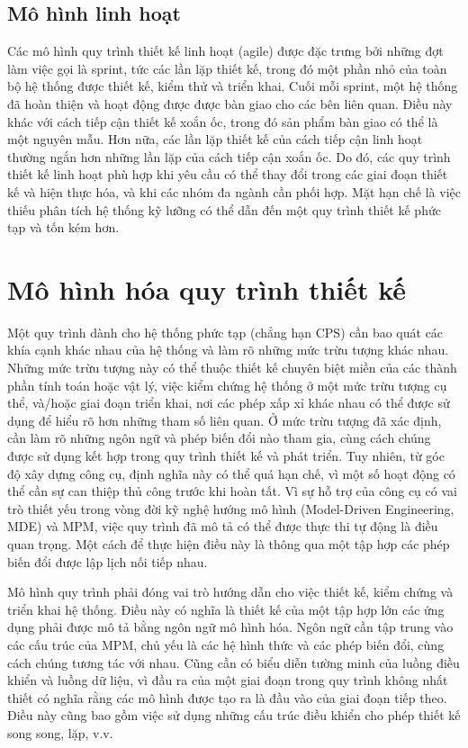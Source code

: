 \subsection{Mô hình linh hoạt}
Các mô hình quy trình thiết kế linh hoạt (agile) được đặc trưng bởi những đợt làm việc gọi là sprint, tức các lần lặp thiết kế, trong đó một phần nhỏ của toàn bộ hệ thống được thiết kế, kiểm thử và triển khai. Cuối mỗi sprint, một hệ thống đã hoàn thiện và hoạt động được được bàn giao cho các bên liên quan. Điều này khác với cách tiếp cận thiết kế xoắn ốc, trong đó sản phẩm bàn giao có thể là một nguyên mẫu. Hơn nữa, các lần lặp thiết kế của cách tiếp cận linh hoạt thường ngắn hơn những lần lặp của cách tiếp cận xoắn ốc. Do đó, các quy trình thiết kế linh hoạt phù hợp khi yêu cầu có thể thay đổi trong các giai đoạn thiết kế và hiện thực hóa, và khi các nhóm đa ngành cần phối hợp. Mặt hạn chế là việc thiếu phân tích hệ thống kỹ lưỡng có thể dẫn đến một quy trình thiết kế phức tạp và tốn kém hơn.

\section{Mô hình hóa quy trình thiết kế}
Một quy trình dành cho hệ thống phức tạp (chẳng hạn CPS) cần bao quát các khía cạnh khác nhau của hệ thống và làm rõ những mức trừu tượng khác nhau. Những mức trừu tượng này có thể thuộc thiết kế chuyên biệt miền của các thành phần tính toán hoặc vật lý, việc kiểm chứng hệ thống ở một mức trừu tượng cụ thể, và/hoặc giai đoạn triển khai, nơi các phép xấp xỉ khác nhau có thể được sử dụng để hiểu rõ hơn những tham số liên quan. Ở mức trừu tượng đã xác định, cần làm rõ những ngôn ngữ và phép biến đổi nào tham gia, cùng cách chúng được sử dụng kết hợp trong quy trình thiết kế và phát triển. Tuy nhiên, từ góc độ xây dựng công cụ, định nghĩa này có thể quá hạn chế, vì một số hoạt động có thể cần sự can thiệp thủ công trước khi hoàn tất. Vì sự hỗ trợ của công cụ có vai trò thiết yếu trong vòng đời kỹ nghệ hướng mô hình (Model-Driven Engineering, MDE) và MPM, việc quy trình đã mô tả có thể được thực thi tự động là điều quan trọng. Một cách để thực hiện điều này là thông qua một tập hợp các phép biến đổi được lập lịch nối tiếp nhau.

Mô hình quy trình phải đóng vai trò hướng dẫn cho việc thiết kế, kiểm chứng và triển khai hệ thống. Điều này có nghĩa là thiết kế của một tập hợp lớn các ứng dụng phải được mô tả bằng ngôn ngữ mô hình hóa. Ngôn ngữ cần tập trung vào các cấu trúc của MPM, chủ yếu là các hệ hình thức và các phép biến đổi, cùng cách chúng tương tác với nhau. Cũng cần có biểu diễn tường minh của luồng điều khiển và luồng dữ liệu, vì đầu ra của một giai đoạn trong quy trình không nhất thiết có nghĩa rằng các mô hình được tạo ra là đầu vào của giai đoạn tiếp theo. Điều này cũng bao gồm việc sử dụng những cấu trúc điều khiển cho phép thiết kế song song, lặp, v.v.

